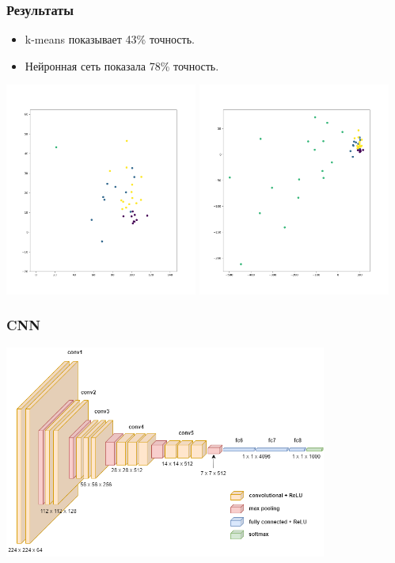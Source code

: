 \documentclass{beamer}
\begin{document}
\begin{frame}
	\frametitle{Результаты}
	\begin{itemize}
		\item k-means показывает 43\% точность.
		\item Нейронная сеть показала 78\% точность.
	\end{itemize}
	\includegraphics[width=0.475\textwidth]{Figure_1.png}
	\hfill
	\includegraphics[width=0.475\textwidth]{Figure_2.png}
\end{frame}

\begin{frame}
	\frametitle{CNN}
	\centering
	\includegraphics[height=7cm]{conv.png}
\end{frame}
\end{document}
